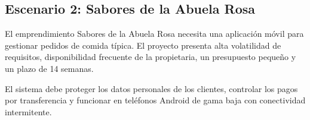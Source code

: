 

\subsection{Escenario 2: Sabores de la Abuela Rosa}

El emprendimiento Sabores de la Abuela Rosa necesita
una aplicación móvil para gestionar pedidos de comida
típica. El proyecto presenta alta volatilidad de
requisitos, disponibilidad frecuente de la propietaria,
un presupuesto pequeño y un plazo de 14 semanas.

El sistema debe proteger los datos personales de los
clientes, controlar los pagos por transferencia y
funcionar en teléfonos Android de gama baja con
conectividad intermitente.

\small
\setlength{\tabcolsep}{4pt}
\renewcommand{\arraystretch}{1.35}

